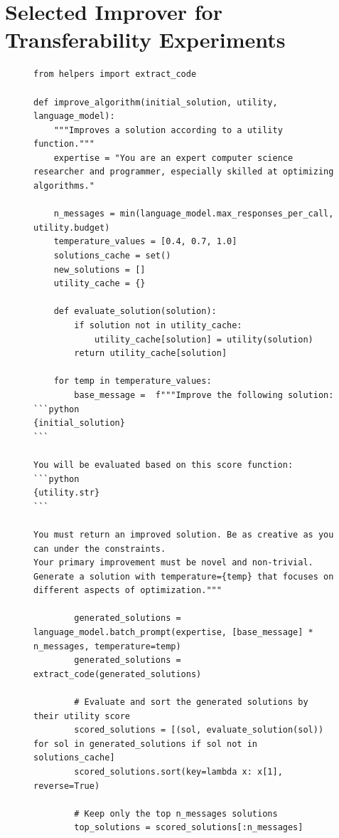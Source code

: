 \documentclass{article}
\begin{document}
\clearpage
\newpage
\section{Selected Improver for Transferability Experiments}
\label{ap:selectedopt}

\begin{figure}[h]
  \centering 
\begin{mybox}
\vspace{-6pt}
\begin{lstlisting}[style=mystyle]
from helpers import extract_code

def improve_algorithm(initial_solution, utility, language_model):
    """Improves a solution according to a utility function."""
    expertise = "You are an expert computer science researcher and programmer, especially skilled at optimizing algorithms."
    
    n_messages = min(language_model.max_responses_per_call, utility.budget)
    temperature_values = [0.4, 0.7, 1.0]
    solutions_cache = set()
    new_solutions = []
    utility_cache = {}

    def evaluate_solution(solution):
        if solution not in utility_cache:
            utility_cache[solution] = utility(solution)
        return utility_cache[solution]

    for temp in temperature_values:
        base_message =  f"""Improve the following solution:
```python
{initial_solution}
```

You will be evaluated based on this score function:
```python
{utility.str}
```

You must return an improved solution. Be as creative as you can under the constraints.
Your primary improvement must be novel and non-trivial. Generate a solution with temperature={temp} that focuses on different aspects of optimization."""
        
        generated_solutions = language_model.batch_prompt(expertise, [base_message] * n_messages, temperature=temp)
        generated_solutions = extract_code(generated_solutions)
        
        # Evaluate and sort the generated solutions by their utility score
        scored_solutions = [(sol, evaluate_solution(sol)) for sol in generated_solutions if sol not in solutions_cache]
        scored_solutions.sort(key=lambda x: x[1], reverse=True)
        
        # Keep only the top n_messages solutions
        top_solutions = scored_solutions[:n_messages]
        

\end{lstlisting}
\end{mybox}
\end{figure}
\end{document}
